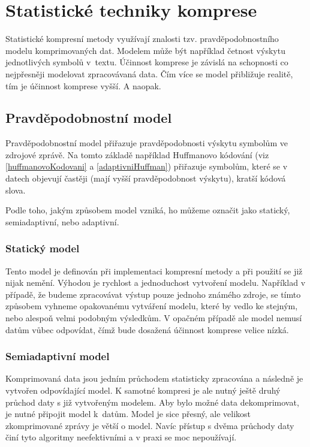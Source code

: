 \chapter{Statistické techniky komprese}
\label{kapitolaStatistickaKomprese}
Statistické kompresní metody využívají znalosti tzv. pravděpodobnostního modelu komprimovaných dat. Modelem může být například četnost výskytu jednotlivých symbolů v~textu. Účinnost komprese je závislá na schopnosti co nejpřesněji modelovat zpracovávaná data. Čím více se model přibližuje realitě, tím je účinnost komprese vyšší. A naopak.

\section{Pravděpodobnostní model}
\label{pravdepodobnostniModel}
Pravděpodobnostní model přiřazuje pravděpodobnosti výskytu symbolům ve zdrojové zprávě. Na tomto základě například Huffmanovo kódování (viz \ref{huffmanovoKodovani} a \ref{adaptivniHuffman}) přiřazuje symbolům, které se v datech objevují častěji (mají vyšší pravděpodobnost výskytu), kratší kódová slova.

Podle toho, jakým způsobem model vzniká, ho můžeme označit jako statický, semiadaptivní, nebo adaptivní.

\subsection{Statický model}
Tento model je definován při implementaci kompresní metody a při použití se již nijak nemění. Výhodou je rychlost a jednoduchost vytvoření modelu. Například v případě, že budeme zpracovávat výstup pouze jednoho známého zdroje, se tímto způsobem vyhneme opakovanému vytváření modelu, které by vedlo ke stejným, nebo alespoň velmi podobným výsledkům. V opačném případě ale model nemusí datům vůbec odpovídat, čímž bude dosažená účinnost komprese velice nízká.

\subsection{Semiadaptivní model}
Komprimovaná data jsou jedním průchodem statisticky zpracována a následně je vytvořen odpovídající model. K samotné kompresi je ale nutný ještě druhý průchod daty s již vytvořeným modelem. Aby bylo možné data dekomprimovat, je nutné připojit model k~datům. Model je sice přesný, ale velikost zkomprimované zprávy je větší o model. Navíc přístup s dvěma průchody daty činí tyto algoritmy neefektivními a v praxi se moc nepoužívají.


